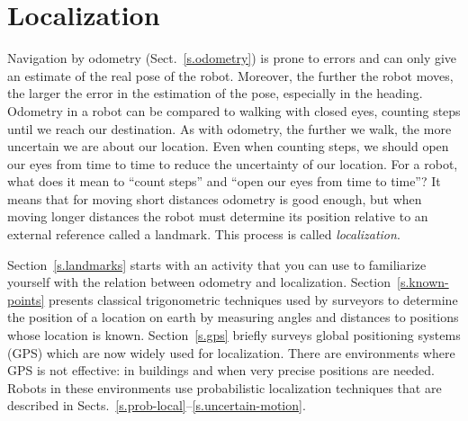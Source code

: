 
\chapter{Localization}\label{ch.local}


Navigation by odometry (Sect.~\ref{s.odometry}) is prone to errors and can only give an estimate of the real pose of the robot. Moreover, the further the robot moves, the larger the error in the estimation of the pose, especially in the heading. Odometry in a robot can be compared to walking with closed eyes, counting steps until we reach our destination. As with odometry, the further we walk, the more uncertain we are about our location. Even when counting steps, we should open our eyes from time to time to reduce the uncertainty of our location. For a robot, what does it mean to ``count steps'' and ``open our eyes from time to time''? It means that for moving short distances odometry is good enough, but when moving longer distances the robot must determine its position relative to an external reference called a landmark. This process is called \emph{localization}.

Section~\ref{s.landmarks} starts with an activity that you can use to familiarize yourself with the relation between odometry and localization. Section~\ref{s.known-points} presents classical trigonometric techniques used by surveyors to determine the position of a location on earth by measuring angles and distances to positions whose location is known. Section~\ref{s.gps} briefly surveys global positioning systems (GPS) which are now widely used for localization. There are environments where GPS is not effective: in buildings and when very precise positions are needed. Robots in these environments use probabilistic localization techniques that are described in Sects.~\ref{s.prob-local}--\ref{s.uncertain-motion}.

